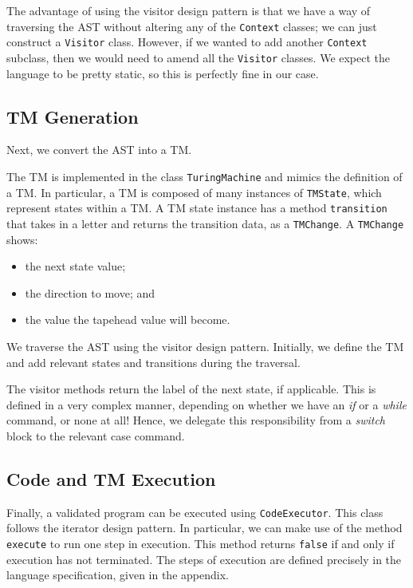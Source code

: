 The advantage of using the visitor design pattern is that we have a way of traversing the AST without altering any of the \texttt{Context} classes; we can just construct a \texttt{Visitor} class. However, if we wanted to add another \texttt{Context} subclass, then we would need to amend all the \texttt{Visitor} classes. We expect the language to be pretty static, so this is perfectly fine in our case.


\subsection{TM Generation}
Next, we convert the AST into a TM. 

The TM is implemented in the class \texttt{TuringMachine} and mimics the definition of a TM. In particular, a TM is composed of many instances of \texttt{TMState}, which represent states within a TM. A TM state instance has a method \texttt{transition} that takes in a letter and returns the transition data, as a \texttt{TMChange}. A \texttt{TMChange} shows:
\begin{itemize}
    \item the next state value;
    \item the direction to move; and
    \item the value the tapehead value will become.
\end{itemize}

We traverse the AST using the visitor design pattern. Initially, we define the TM and add relevant states and transitions during the traversal. 

The visitor methods return the label of the next state, if applicable. This is defined in a very complex manner, depending on whether we have an \textit{if} or a \textit{while} command, or none at all! Hence, we delegate this responsibility from a \textit{switch} block to the relevant case command.

\subsection{Code and TM Execution}
Finally, a validated program can be executed using \texttt{CodeExecutor}. This class follows the iterator design pattern. In particular, we can make use of the method \texttt{execute} to run one step in execution. This method returns \texttt{false} if and only if execution has not terminated. The steps of execution are defined precisely in the language specification, given in the appendix.

